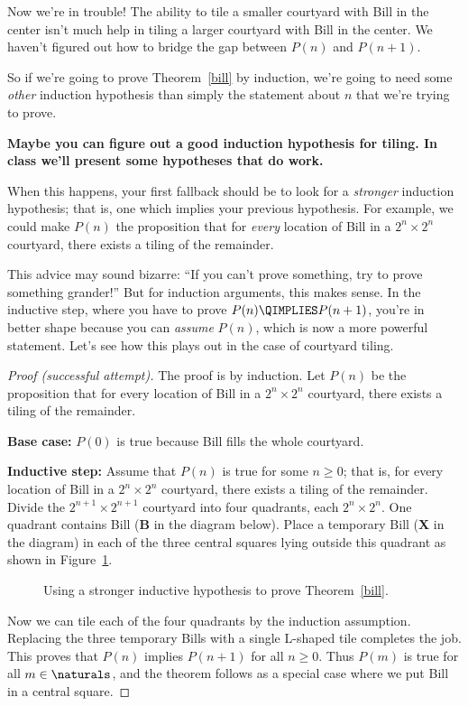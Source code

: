 Now we're in trouble!  The ability to tile a smaller courtyard with Bill
in the center isn't much help in tiling a larger courtyard with Bill in
the center.  We haven't figured out how to bridge the gap between $P(n)$
and $P(n+1)$.

So if we're going to prove Theorem~\ref{bill} by induction, we're going to
need some \emph{other} induction hypothesis than simply the statement
about $n$ that we're trying to prove.



\textbf{Maybe you can figure out a good induction hypothesis for
  tiling.  In class we'll present some hypotheses that do work.}


\iffalse  %

When this happens, your first fallback should be to look for a
\emph{stronger} induction hypothesis; that is, one which implies
your previous hypothesis.  For example, we could make $P(n)$ the
proposition that for \emph{every} location of Bill in a $2^n \times
2^n$ courtyard, there exists a tiling of the remainder.

This advice may sound bizarre: ``If you can't prove something, try to
prove something grander!''  But for induction arguments, this makes
sense.  In the inductive step, where you have to prove $P(n) \QIMPLIES
P(n+1)$, you're in better shape because you can \emph{assume} $P(n)$,
which is now a more powerful statement.  Let's see how this plays out
in the case of courtyard tiling.

\begin{proof}[Proof (successful attempt)]
The proof is by induction.  Let $P(n)$ be the proposition that for
every location of Bill in a $2^n \times 2^n$ courtyard, there exists a
tiling of the remainder.

\textbf{Base case:} $P(0)$ is true because Bill fills the
whole courtyard.

\textbf{Inductive step:} Assume that $P(n)$ is true for some
$n \geq 0$; that is, for every location of Bill in a $2^n \times 2^n$
courtyard, there exists a tiling of the remainder.  Divide the
$2^{n+1} \times 2^{n+1}$ courtyard into four quadrants, each $2^n
\times 2^n$.  One quadrant contains Bill (\textbf{B} in the diagram
below).  Place a temporary Bill (\textbf{X} in the diagram) in each of
the three central squares lying outside this quadrant as shown in
Figure~\ref{fig:stronger-bill}.

\begin{figure}


\caption{Using a stronger inductive hypothesis to prove
  Theorem~\ref{bill}.}
\label{fig:stronger-bill}
\end{figure}

Now we can tile each of the four quadrants by the induction
assumption.  Replacing the three temporary Bills with a single
L-shaped tile completes the job.  This proves that $P(n)$ implies
$P(n+1)$ for all $n \geq 0$.  Thus $P(m)$ is true for all $m \in
\naturals$, and the theorem follows as a special case where we put
Bill in a central square.
\end{proof}

